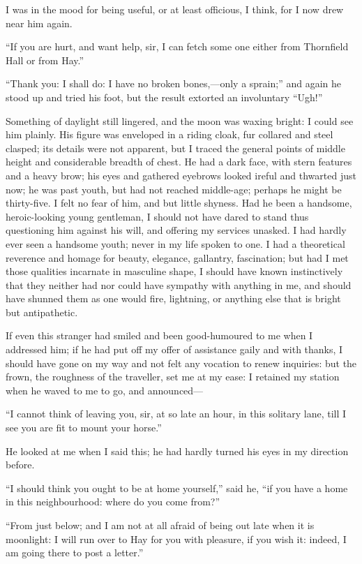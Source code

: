 I was in the mood for being useful, or at least officious, I think, for
I now drew near him again.

\enquote{If you are hurt, and want help, sir, I can fetch some one
either from Thornfield Hall or from Hay.}

\enquote{Thank you: I shall do: I have no broken bones,---only a
sprain;} and again he stood up and tried his foot, but the result
extorted an involuntary \enquote{Ugh!}

Something of daylight still lingered, and the moon was waxing bright: I
could see him plainly. His figure was enveloped in a riding cloak, fur
collared and steel clasped; its details were not apparent, but I traced
the general points of middle height and considerable breadth of chest. 
He had a dark face, with stern features and a heavy brow; his eyes and
gathered eyebrows looked ireful and thwarted just now; he was past
youth, but had not reached middle-age; perhaps he might be thirty-five. 
I felt no fear of him, and but little shyness. Had he been a handsome,
heroic-looking young gentleman, I should not have dared to stand thus
questioning him against his will, and offering my services unasked. I
had hardly ever seen a handsome youth; never in my life spoken to one. 
I had a theoretical reverence and homage for beauty, elegance,
gallantry, fascination; but had I met those qualities incarnate in
masculine shape, I should have known instinctively that they neither had
nor could have sympathy with anything in me, and should have shunned
them as one would fire, lightning, or anything else that is bright but
antipathetic.

If even this stranger had smiled and been good-humoured to me when I
addressed him; if he had put off my offer of assistance gaily and with
thanks, I should have gone on my way and not felt any vocation to renew
inquiries: but the frown, the roughness of the traveller, set me at my
ease: I retained my station when he waved to me to go, and announced---

\enquote{I cannot think of leaving you, sir, at so late an hour, in this
solitary lane, till I see you are fit to mount your horse.}

He looked at me when I said this; he had hardly turned his eyes in my
direction before.

\enquote{I should think you ought to be at home yourself,} said he,
\enquote{if you have a home in this neighbourhood: where do you come
from?}

\enquote{From just below; and I am not at all afraid of being out late
when it is moonlight: I will run over to Hay for you with pleasure, if
you wish it: indeed, I am going there to post a letter.}

